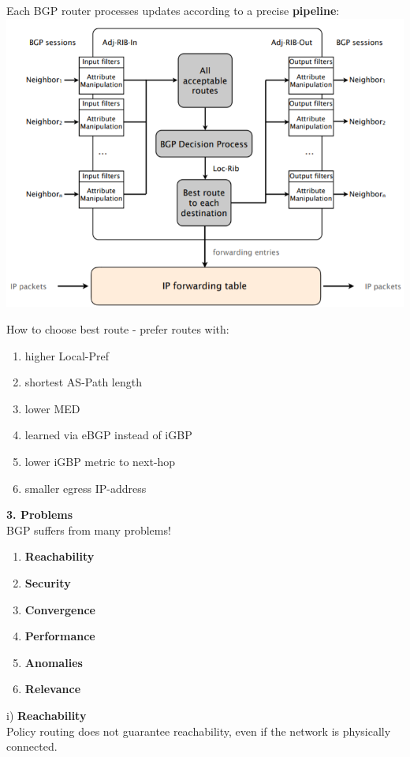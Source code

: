 \documentclass[a4paper, fontsize=8pt, landscape, DIV=1]{scrartcl}
\begin{document}
\begin{multicols*}{4}
\begin{center}
		\end{center}
		\par 
		Each BGP router processes updates according to a precise \textbf{pipeline}: 
		\includegraphics[width=\columnwidth]{images/Network_Layer/pipeline.png}
		\newpage
		
		How to choose best route - prefer routes with:
		\vspace{-0.2cm} 
		\begin{enumerate}[noitemsep]
			\item higher Local-Pref
			\item shortest AS-Path length
			\item lower MED
			\item learned via eBGP instead of iGBP
			\item lower iGBP metric to next-hop
			\item smaller egress IP-address
		\end{enumerate}
		\par 
		\textbf{3. Problems}\\
		BGP suffers from many problems!
		\begin{enumerate}[label=(\roman*), noitemsep]
			\item \textbf{Reachability}
			\item \textbf{Security}
			\item \textbf{Convergence} 
			\item \textbf{Performance} 
			\item \textbf{Anomalies}
			\item \textbf{Relevance} 
		\end{enumerate}
		i) \textbf{Reachability}\\
		Policy routing does not guarantee reachability, even if the network is
		physically connected.\par 
		

\end{multicols*}
\end{document}
